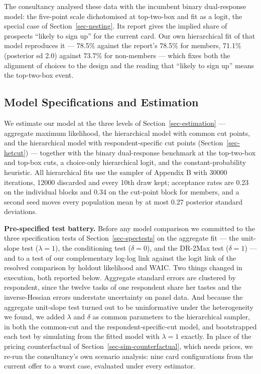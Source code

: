 \documentclass[
  letterpaper,
  DIV=11,
  numbers=noendperiod]{scrartcl}
\theoremstyle{plain}
\theoremstyle{plain}
\theoremstyle{plain}
\theoremstyle{remark}
\begin{document}
The consultancy analysed these data with the incumbent binary
dual-response model: the five-point scale dichotomised at top-two-box
and fit as a logit, the special case of Section~\ref{sec-nesting}. Its
report gives the implied share of prospects ``likely to sign up'' for
the current card. Our own hierarchical fit of that model reproduces it
--- 78.5\% against the report's 78.5\% for members, 71.1\% (posterior sd
2.0) against 73.7\% for non-members --- which fixes both the alignment
of choices to the design and the reading that ``likely to sign up''
means the top-two-box event.

\subsection{Model Specifications and
Estimation}\label{sec-empirical-spec}

We estimate our model at the three levels of
Section~\ref{sec-estimation} --- aggregate maximum likelihood, the
hierarchical model with common cut points, and the hierarchical model
with respondent-specific cut points (Section~\ref{sec-hetcut}) ---
together with the binary dual-response benchmark at the top-two-box and
top-box cuts, a choice-only hierarchical logit, and the
constant-probability heuristic. All hierarchical fits use the sampler of
Appendix B with 30000 iterations, 12000 discarded and every 10th draw
kept; acceptance rates are 0.23 on the individual blocks and 0.34 on the
cut-point block for members, and a second seed moves every population
mean by at most 0.27 posterior standard deviations.

\textbf{Pre-specified test battery.} Before any model comparison we
committed to the three specification tests of
Section~\ref{sec-spectests} on the aggregate fit --- the unit-slope test
(\(\lambda = 1\)), the conditioning test (\(\delta = 0\)), and the
DR-2Max test (\(\delta = 1\)) --- and to a test of our complementary
log-log link against the logit link of the resolved comparison by
holdout likelihood and WAIC. Two things changed in execution, both
reported below. Aggregate standard errors are clustered by respondent,
since the twelve tasks of one respondent share her tastes and the
inverse-Hessian errors understate uncertainty on panel data. And because
the aggregate unit-slope test turned out to be uninformative under the
heterogeneity we found, we added \(\lambda\) and \(\delta\) as common
parameters to the hierarchical sampler, in both the common-cut and the
respondent-specific-cut model, and bootstrapped each test by simulating
from the fitted model with \(\lambda = 1\) exactly. In place of the
pricing counterfactual of Section~\ref{sec-sim-counterfactual}, which
needs prices, we re-run the consultancy's own scenario analysis: nine
card configurations from the current offer to a worst case, evaluated
under every estimator.
\end{document}
